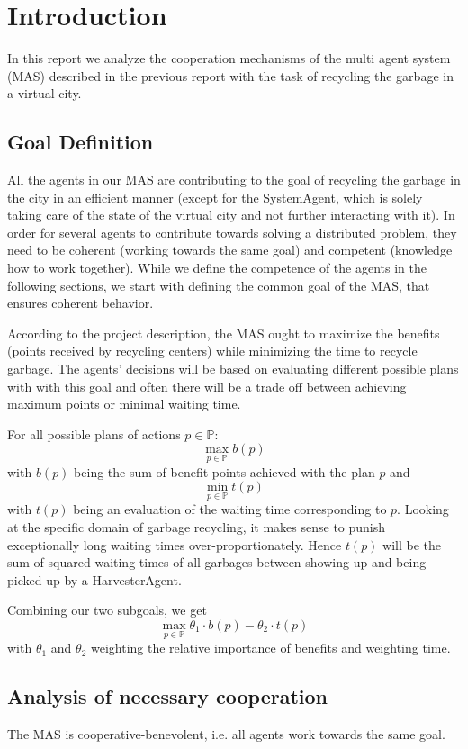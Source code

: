 \section{Introduction}

In this report we analyze the cooperation mechanisms of the multi agent system (MAS) described in the previous report with the task of recycling the garbage in a virtual city.

\subsection{Goal Definition}

All the agents in our MAS are contributing to the goal of recycling the garbage in the city in an efficient manner (except for the SystemAgent, which is solely taking care of the state of the virtual city and not further interacting with it). In order for several agents to contribute towards solving a distributed problem, they need to be coherent (working towards the same goal) and competent (knowledge how to work together). While we define the competence of the agents in the following sections, we start with defining the common goal of the MAS, that ensures coherent behavior.

According to the project description, the MAS ought to maximize the benefits (points received by recycling centers) while minimizing the time to recycle garbage. The agents' decisions will be based on evaluating different possible plans with with this goal and often there will be a trade off between achieving maximum points or minimal waiting time. 

For all possible plans of actions $ p \in \mathbb{P} $: \[ \max_{p \in \mathbb{P}} b(p)\] with $ b(p) $ being the sum of benefit points achieved with the plan $p$ and \[ \min_{p \in \mathbb{P}} t(p)\] with $t(p)$ being an evaluation of the waiting time corresponding to $p$. Looking at the specific domain of garbage recycling, it makes sense to punish exceptionally long waiting times over-proportionately. Hence $ t(p) $ will be the sum of squared waiting times of all garbages between showing up and being picked up by a HarvesterAgent.

Combining our two subgoals, we get \[ \max_{p \in \mathbb{P}} \theta_1 \cdot b(p) - \theta_2 \cdot t(p)\] with $ \theta_1 $ and $ \theta_2 $ weighting the relative importance of benefits and weighting time.

\subsection{Analysis of necessary cooperation}

The MAS is cooperative-benevolent, i.e. all agents work towards the same goal.

